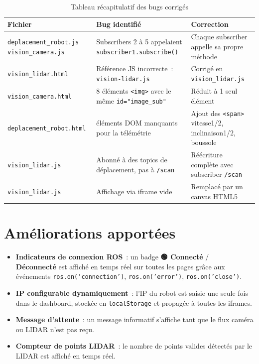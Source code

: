 \documentclass[12pt,a4paper]{report}
\begin{document}
\begin{table}[H]
\centering
\begin{tabularx}{\textwidth}{>{\raggedright\arraybackslash}p{3cm} X X}
\toprule
\textbf{Fichier} & \textbf{Bug identifié} & \textbf{Correction} \\
\midrule
\texttt{deplacement\_robot.js} \newline \texttt{vision\_camera.js} &
Subscribers 2 à 5 appelaient \texttt{subscriber1.subscribe()} &
Chaque subscriber appelle sa propre méthode \\
\midrule
\texttt{vision\_lidar.html} &
Référence JS incorrecte~: \texttt{vision-lidar.js} &
Corrigé en \texttt{vision\_lidar.js} \\
\midrule
\texttt{vision\_camera.html} &
8 éléments \texttt{<img>} avec le même \texttt{id="image\_sub"} &
Réduit à 1 seul élément \\
\midrule
\texttt{deplacement\_robot.html} &
éléments DOM manquants pour la télémétrie &
Ajout des \texttt{<span>} vitesse1/2, inclinaison1/2, boussole \\
\midrule
\texttt{vision\_lidar.js} &
Abonné à des topics de déplacement, pas à \texttt{/scan} &
Réécriture complète avec subscriber \texttt{/scan} \\
\midrule
\texttt{vision\_lidar.js} &
Affichage via iframe vide &
Remplacé par un canvas HTML5 \\
\bottomrule
\end{tabularx}
\caption{Tableau récapitulatif des bugs corrigés}
\end{table}

\section{Améliorations apportées}

\begin{itemize}
  \item \textbf{Indicateurs de connexion ROS}~: un badge \textcolor{successgreen}{\textbf{🟢 Connecté}} / \textcolor{codered}{\textbf{🔴 Déconnecté}} est affiché en temps réel sur toutes les pages grâce aux événements \texttt{ros.on('connection')}, \texttt{ros.on('error')}, \texttt{ros.on('close')}.
  \item \textbf{IP configurable dynamiquement}~: l'IP du robot est saisie une seule fois dans le dashboard, stockée en \texttt{localStorage} et propagée à toutes les iframes.
  \item \textbf{Message d'attente}~: un message informatif s'affiche tant que le flux caméra ou LIDAR n'est pas reçu.
  \item \textbf{Compteur de points LIDAR}~: le nombre de points valides détectés par le LIDAR est affiché en temps réel.
\end{itemize}
\end{document}
